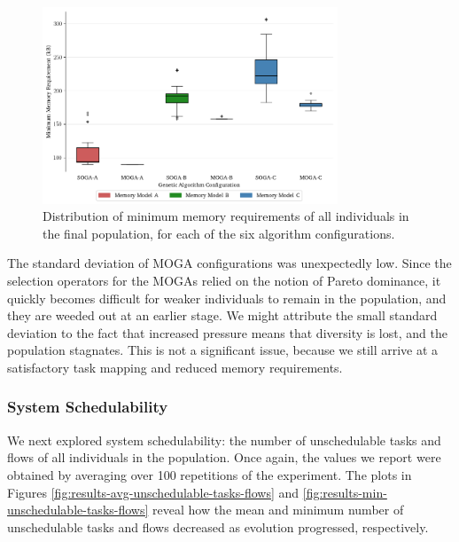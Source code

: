 \documentclass[10pt,conference]{IEEEtran}
\begin{document}
\begin{figure}[!ht]
  \centering
  \includegraphics*[width=8.8cm,keepaspectratio]{fig/results-min-memory-requirement-boxplot}
\vspace{-4ex}
  \caption{Distribution of minimum memory requirements of all individuals in the final population, for each of the six algorithm configurations.}
  \label{fig:results-min-memory-requirement-boxplot}
\vspace{-3ex}
\end{figure}

The standard deviation of MOGA configurations was unexpectedly low. Since the selection operators for the MOGAs relied on the notion of Pareto dominance, it quickly becomes difficult for weaker individuals to remain in the population, and they are weeded out at an earlier stage. We might attribute the small standard deviation to the fact that increased pressure means that diversity is lost, and the population stagnates. This is not a significant issue, because we still arrive at a satisfactory task mapping and reduced memory requirements.

\subsubsection{System Schedulability}\label{sec:system-schedulability}

We next explored system schedulability: the number of unschedulable tasks and flows of all individuals in the population. Once again, the values we report were obtained by averaging over 100 repetitions of the experiment. The plots in Figures \ref{fig:results-avg-unschedulable-tasks-flows} and \ref{fig:results-min-unschedulable-tasks-flows} reveal how the mean and minimum number of unschedulable tasks and flows decreased as evolution progressed, respectively.
\end{document}
